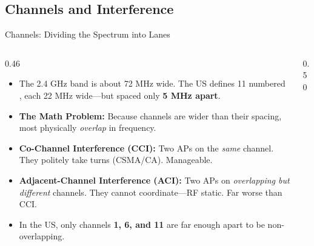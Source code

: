 \documentclass[aspectratio=169]{beamer}
\begin{document}
\subsection{Channels and Interference}

\begin{frame}{Channels: Dividing the Spectrum into Lanes}
    \begin{columns}[T]
        \begin{column}{0.46\textwidth}
            \footnotesize
            \begin{itemize}
                \item The 2.4 GHz band is about 72 MHz wide. The US defines 11 numbered , each 22 MHz wide---but spaced only \textbf{5 MHz apart}.
                \item \textbf{The Math Problem:} Because channels are wider than their spacing, most physically \emph{overlap} in frequency.
                \item \textbf{Co-Channel Interference (CCI):} Two APs on the \emph{same} channel. They politely take turns (CSMA/CA). Manageable.
                \item \textbf{Adjacent-Channel Interference (ACI):} Two APs on \emph{overlapping but different} channels. They cannot coordinate---RF static. Far worse than CCI.
                \item In the US, only channels \textbf{1, 6, and 11} are far enough apart to be non-overlapping.
            \end{itemize}
        \end{column}
        \begin{column}{0.50\textwidth}
            \begin{center}
\end{center}
\end{column}
\end{columns}
\end{frame}
\end{document}

